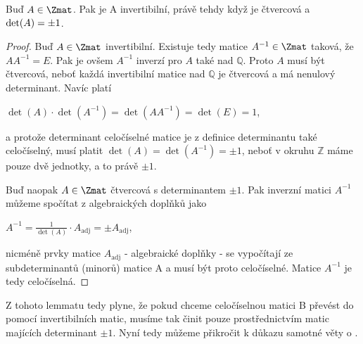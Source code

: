 \begin{lem}
    Buď $A \in \Zmat$. Pak je A invertibilní, právě tehdy když je čtvercová a
    $\textnormal{det}(A) = \pm1$.
\end{lem}
\begin{proof}
    Buď $A \in \Zmat$ invertibilní. Existuje tedy matice $A^{-1} \in \Zmat$
    taková, že $AA^{-1} = E$. Pak je ovšem $A^{-1}$ inverzí pro $A$ také nad
    $\mathbb{Q}$. Proto $A$ musí být čtvercová, neboť každá invertibilní matice
    nad $\mathbb{Q}$ je čtvercová a má nenulový determinant. Navíc platí
    \begin{center}
        $ \det(A) \cdot \det(A^{-1}) = \det(AA^{-1}) = \det(E) = 1 $,
    \end{center}
    a protože determinant celočíselné matice je z definice determinantu
    také celočíselný, musí platit $ \det(A) = \det(A^{-1}) = \pm1$, neboť v okruhu
    $\mathbb{Z}$ máme pouze dvě jednotky, a to právě $\pm1$.

    Buď naopak $A \in \Zmat$ čtvercová s determinantem $\pm1$. Pak inverzní
    matici $A^{-1}$ můžeme spočítat z algebraických doplňků jako
    \begin{center}
        $A^{-1} = \frac{1}{\operatorname{det}(A)} \cdot A_{\mathrm{adj}} = \pm A_{\mathrm{adj}}$,
    \end{center}
    nicméně prvky matice $A_{\mathrm{adj}}$ - algebraické doplňky - se vypočítají
    ze subdeterminantů (minorů) matice A a musí být proto celočíselné. Matice
    $A^{-1}$ je tedy celočíselná.
\end{proof}

Z tohoto lemmatu tedy plyne, že pokud chceme celočíselnou matici B převést do
\snf{} pomocí invertibilních matic, musíme tak činit pouze prostřednictvím
matic majících determinant $\pm1$. Nyní tedy můžeme přikročit k důkazu samotné
věty o \snf{}.

